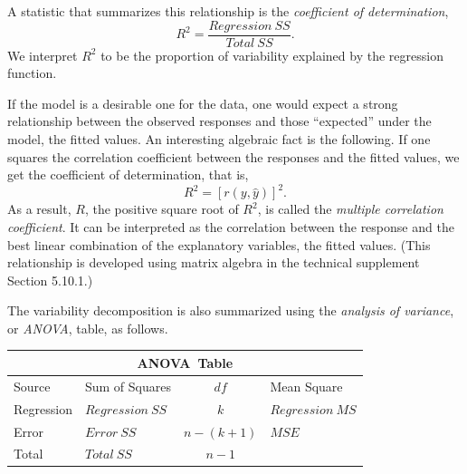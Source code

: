 A statistic that summarizes this relationship is the
\emph{coefficient of determination},
\begin{equation*}
R^2=\frac{Regression~SS}{Total~SS}.
\end{equation*}
We interpret $R^2$ to be the proportion of variability explained by
the regression function.

If the model is a desirable one for the data, one would expect a
strong relationship between the observed responses and those
``expected'' under the model, the fitted values. An interesting
algebraic fact is the following. If one squares the correlation
coefficient between the responses and the fitted values, we get the
coefficient of determination, that is,
\begin{equation*}
R^2=\left[ r \left(y,\widehat{y} \right) \right]^2.
\end{equation*}
As a result, $R$, the positive square root of $R^2$, is called the
\emph{multiple correlation coefficient}. It can be interpreted as
the correlation between the response and the best linear combination
of the explanatory variables, the fitted values. (This relationship
is developed using matrix algebra in the technical supplement
Section 5.10.1.)


The variability decomposition is also summarized using the
\emph{analysis of variance}, or \emph{ANOVA}, table, as
follows.


\begin{center}
\begin{tabular}{l|lcl}
\hline
\multicolumn{4}{c}{ANOVA\ Table} \\ \hline
Source & Sum of Squares & $df$ & Mean Square \\ \hline
Regression & $Regression~SS$ & $k$ & $Regression~MS$ \\
Error & $Error~SS$ & $n-(k+1)$ & $MSE$ \\
Total & $Total~SS$ & $n-1$ &  \\ \hline
\end{tabular}
\end{center}

